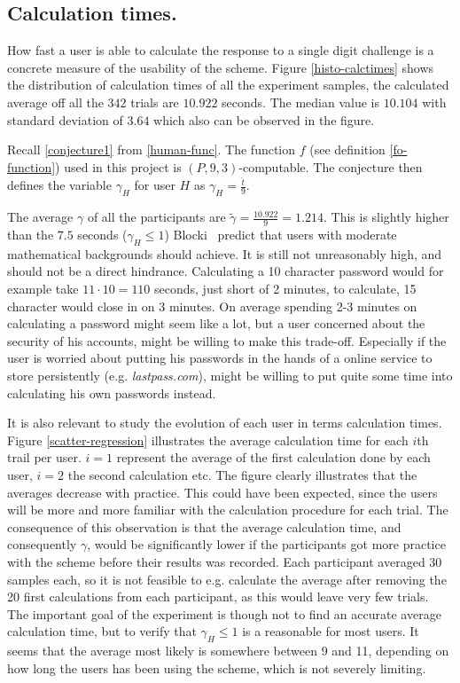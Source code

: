 \subsection{Calculation times.}
How fast a user is able to calculate the response to a single digit challenge is a concrete measure of the usability of the scheme. Figure \ref{histo-calctimes} shows the distribution of calculation times of all the experiment samples, the calculated average off all the $342$ trials are $10.922$ seconds. The median value is $10.104$ with standard deviation of $3.64$ which also can be observed in the figure. 
\par Recall \autoref{conjecture1} from \autoref{human-func}. The function $f$ (see definition \ref{fo-function}) used in this project is $(P,9,3)$-computable. The conjecture then defines the variable $\gamma_H$ for user $H$ as {\Large $\gamma_H = \frac{\hat t}{9}$}. 
\par The average $\gamma$ of all the participants are $\tilde \gamma = \frac{10.922}{9} = 1.214$. This is slightly higher than the $7.5$ seconds ($\gamma_H \le 1 $) Blocki~\cite{hcp-blocki} predict that users with moderate mathematical backgrounds should achieve. It is still not unreasonably high, and should not be a direct hindrance. Calculating a 10 character password would for example take $11 \cdot 10 = 110$ seconds, just short of 2 minutes, to calculate, 15 character would close in on 3 minutes. On average spending 2-3 minutes on calculating a password might seem like a lot, but a user concerned about the security of his accounts, might be willing to make this trade-off. Especially if the user is worried about putting his passwords in the hands of a online service to store persistently (e.g. \emph{lastpass.com}), might be willing to put quite some time into calculating his own passwords instead.
\par It is also relevant to study the evolution of each user in terms calculation times. Figure \ref{scatter-regression} illustrates the average calculation time for each $i$th trail per user. $i=1$ represent the average of the first calculation done by each user, $i=2$ the second calculation etc. The figure clearly illustrates that the averages decrease with practice. This could have been expected, since the users will be more and more familiar with the calculation procedure for each trial. The consequence of this observation is that the average calculation time, and consequently $\gamma$, would be significantly lower if the participants got more practice with the scheme before their results was recorded. Each participant averaged $30$ samples each, so it is not feasible to e.g. calculate the average after removing the 20 first calculations from each participant, as this would leave very few trials. The important goal of the experiment is though not to find an accurate average calculation time, but to verify that $\gamma_H \le 1$ is a reasonable for most users. It seems that the average most likely is somewhere between 9 and 11, depending on how long the users has been using the scheme, which is not severely limiting.

